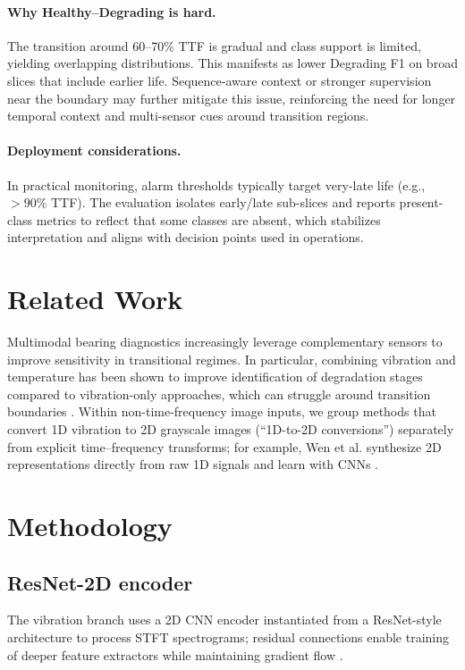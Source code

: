 \documentclass[pdflatex,sn-mathphys-num]{sn-jnl}%
\begin{document}
\paragraph{Why Healthy--Degrading is hard.}
The transition around 60--70\% TTF is gradual and class support is limited, yielding overlapping distributions. This manifests as lower Degrading F1 on broad slices that include earlier life. Sequence-aware context or stronger supervision near the boundary may further mitigate this issue, reinforcing the need for longer temporal context and multi-sensor cues around transition regions.

\paragraph{Deployment considerations.}
In practical monitoring, alarm thresholds typically target very-late life (e.g., $>90\%$ TTF). The evaluation isolates early/late sub-slices and reports present-class metrics to reflect that some classes are absent, which stabilizes interpretation and aligns with decision points used in operations.
\FloatBarrier

\section{Related Work}
\label{sec:related}
Multimodal bearing diagnostics increasingly leverage complementary sensors to improve sensitivity in transitional regimes. In particular, combining vibration and temperature has been shown to improve identification of degradation stages compared to vibration-only approaches, which can struggle around transition boundaries \cite{li2025vibtemp_degradation}. Within non-time-frequency image inputs, we group methods that convert 1D vibration to 2D grayscale images (``1D-to-2D conversions'') separately from explicit time--frequency transforms; for example, Wen et al. synthesize 2D representations directly from raw 1D signals and learn with CNNs \cite{wen2018neurocomputing}.

\section{Methodology}
\label{sec:method}
\subsection{ResNet-2D encoder}
The vibration branch uses a 2D CNN encoder instantiated from a ResNet-style architecture to process STFT spectrograms; residual connections enable training of deeper feature extractors while maintaining gradient flow \cite{he2016resnet}.
\end{document}
